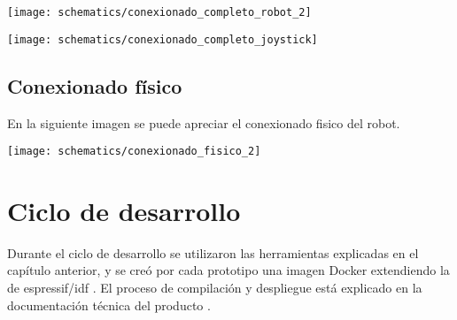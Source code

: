 \begin{center}
\texttt{[image: schematics/conexionado\_completo\_robot\_2]}
  \label{fig:conexionado_completo_robot}
\end{center}


\begin{center}
\texttt{[image: schematics/conexionado\_completo\_joystick]}
  \label{fig:conexionado_completo_joystick}
\end{center}


\subsection{Conexionado físico}

En la siguiente imagen se puede apreciar el conexionado fisico del robot.

\begin{center}
\texttt{[image: schematics/conexionado\_fisico\_2]}
  \label{fig:conexionado_fisico}
\end{center}




\section{Ciclo de desarrollo}

Durante el ciclo de desarrollo se utilizaron las herramientas explicadas en el capítulo anterior, y se creó por cada prototipo una imagen Docker extendiendo la de espressif/idf \cite{Espressif_docker_image}. El proceso de compilación y despliegue está explicado en la documentación técnica del producto \cite{Robot_Tecnical_doc}.










